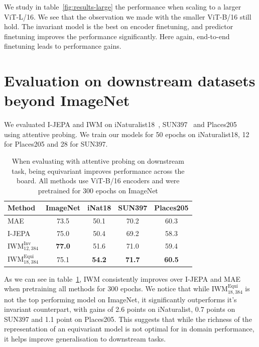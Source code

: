 \documentclass[twocolumn]{fairmeta}
\theoremstyle{plain}
\theoremstyle{definition}
\theoremstyle{remark}
\begin{document}
We study in table~\ref{fig:results-large} the performance when scaling to a larger ViT-L/16. We see that the observation we made with the smaller ViT-B/16 still hold. The invariant model is the best on encoder finetuning, and predictor finetuning improves the performance significantly. Here again, end-to-end finetuning leads to performance gains.


\section{Evaluation on downstream datasets beyond ImageNet\label{app:ood}}

We evaluated I-JEPA and IWM on iNaturalist18~\citep{vanhorni2018naturalist}, SUN397~\citep{xiao2010sun} and Places205~\citep{zhou2014places} using attentive probing. We train our models for 50 epochs on iNaturalist18, 12 for Places205 and 28 for SUN397.

\begin{table}[!h]
\centering
    \caption{When evaluating with attentive probing on downstream task, being equivariant improves performance across the board. All methods use ViT-B/16 encoders and were pretrained for 300 epochs on ImageNet}
    \label{tab:ood}
\begin{tabular}{lcccc}
\toprule
Method  & ImageNet & iNat18 & SUN397 & Places205   \\
\midrule
MAE  & 73.5 & 50.1 & 70.2 & 60.3 \\
I-JEPA & 75.0 & 50.4 & 69.2 & 58.3 \\
$\text{IWM}_{12,384}^\text{Inv}$ & \textbf{77.0} & 51.6 & 71.0 & 59.4 \\
$\text{IWM}_{18,384}^\text{Equi}$ & 75.1 & \textbf{54.2} & \textbf{71.7} & \textbf{60.5} \\

\bottomrule
\end{tabular}

\end{table}

As we can see in table~\ref{tab:ood}, IWM consistently improves over I-JEPA and MAE when pretraining all methods for 300 epochs. We notice that while $\text{IWM}_{18,384}^\text{Equi}$ is not the top performing model on ImageNet, it significantly outperforms it's invariant counterpart, with gains of 2.6 points on iNaturalist, 0.7 points on SUN397 and 1.1 point on Places205. This suggests that while the richness of the representation of an equivariant model is not optimal for in domain performance, it helps improve generalisation to downstream tasks. 
\end{document}
